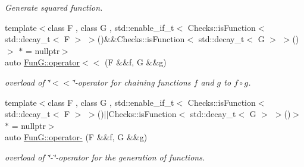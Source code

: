\begin{DoxyCompactItemize}
\begin{DoxyCompactList}\small\item\em Generate squared function. \end{DoxyCompactList}\item 
{\footnotesize template$<$class F , class G , std\+::enable\+\_\+if\+\_\+t$<$ Checks\+::is\+Function$<$ std\+::decay\+\_\+t$<$ F $>$ $>$()\&\&\+Checks\+::is\+Function$<$ std\+::decay\+\_\+t$<$ G $>$ $>$() $>$ $\ast$  = nullptr$>$ }\\auto \hyperlink{namespaceFunG_a65436d4494e99629b0177d0df7634a6b}{Fun\+G\+::operator$<$$<$} (F \&\&f, G \&\&g)
\begin{DoxyCompactList}\small\item\em overload of \char`\"{}$<$$<$\char`\"{}-\/operator for chaining functions $f$ and $g$ to $ f \circ g $. \end{DoxyCompactList}\item 
{\footnotesize template$<$class F , class G , std\+::enable\+\_\+if\+\_\+t$<$ Checks\+::is\+Function$<$ std\+::decay\+\_\+t$<$ F $>$ $>$()$\vert$$\vert$\+Checks\+::is\+Function$<$ std\+::decay\+\_\+t$<$ G $>$ $>$()$>$ $\ast$  = nullptr$>$ }\\auto \hyperlink{namespaceFunG_a3af04c2ef5c1b206feb75fffd298cbbf}{Fun\+G\+::operator-\/} (F \&\&f, G \&\&g)
\begin{DoxyCompactList}\small\item\em overload of \char`\"{}-\/\char`\"{}-\/operator for the generation of functions. \end{DoxyCompactList}\end{DoxyCompactItemize}
